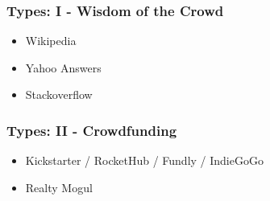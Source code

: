 \documentclass[slides]{beamer} %
\begin{document}
\begin{frame}\frametitle{Types: I - Wisdom of the Crowd}

 \pause

\begin{itemize}

\item Wikipedia

 \pause

\item Yahoo Answers

 \pause

\item Stackoverflow


\end{itemize}

\end{frame}

\begin{frame}\frametitle{Types: II - Crowdfunding}

 \pause

\begin{itemize}

\item Kickstarter / RocketHub / Fundly / IndieGoGo

 \pause

\item Realty Mogul


\end{itemize}

\end{frame}
\end{document}

